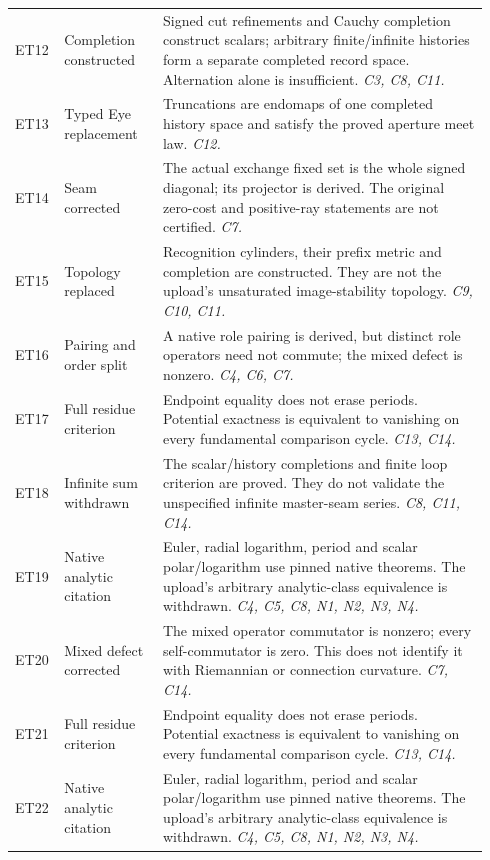 \begin{longtable}{@{}>{\raggedright\arraybackslash}p{0.08\linewidth}>{\raggedright\arraybackslash}p{0.20\linewidth}>{\raggedright\arraybackslash}p{0.66\linewidth}@{}}
ET12 & Completion constructed & Signed cut refinements and Cauchy completion construct scalars; arbitrary finite/infinite histories form a separate completed record space. Alternation alone is insufficient. \emph{C3, C8, C11.} \\[5pt]
ET13 & Typed Eye replacement & Truncations are endomaps of one completed history space and satisfy the proved aperture meet law. \emph{C12.} \\[5pt]
ET14 & Seam corrected & The actual exchange fixed set is the whole signed diagonal; its projector is derived. The original zero-cost and positive-ray statements are not certified. \emph{C7.} \\[5pt]
ET15 & Topology replaced & Recognition cylinders, their prefix metric and completion are constructed. They are not the upload's unsaturated image-stability topology. \emph{C9, C10, C11.} \\[5pt]
ET16 & Pairing and order split & A native role pairing is derived, but distinct role operators need not commute; the mixed defect is nonzero. \emph{C4, C6, C7.} \\[5pt]
ET17 & Full residue criterion & Endpoint equality does not erase periods. Potential exactness is equivalent to vanishing on every fundamental comparison cycle. \emph{C13, C14.} \\[5pt]
ET18 & Infinite sum withdrawn & The scalar/history completions and finite loop criterion are proved. They do not validate the unspecified infinite master-seam series. \emph{C8, C11, C14.} \\[5pt]
ET19 & Native analytic citation & Euler, radial logarithm, period and scalar polar/logarithm use pinned native theorems. The upload's arbitrary analytic-class equivalence is withdrawn. \emph{C4, C5, C8, N1, N2, N3, N4.} \\[5pt]
ET20 & Mixed defect corrected & The mixed operator commutator is nonzero; every self-commutator is zero. This does not identify it with Riemannian or connection curvature. \emph{C7, C14.} \\[5pt]
ET21 & Full residue criterion & Endpoint equality does not erase periods. Potential exactness is equivalent to vanishing on every fundamental comparison cycle. \emph{C13, C14.} \\[5pt]
ET22 & Native analytic citation & Euler, radial logarithm, period and scalar polar/logarithm use pinned native theorems. The upload's arbitrary analytic-class equivalence is withdrawn. \emph{C4, C5, C8, N1, N2, N3, N4.} \\[5pt]

\end{longtable}
